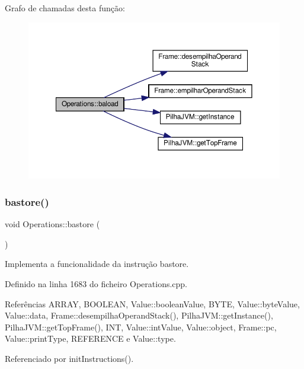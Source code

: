 Grafo de chamadas desta função\+:
\nopagebreak
\begin{figure}[H]
\begin{center}
\leavevmode
\includegraphics[width=350pt]{classOperations_afdf1759637e332569a2b2b17067e05f0_cgraph}
\end{center}
\end{figure}
\mbox{\label{classOperations_a6f0ded6d2fc9921a1418387527bec8f4}} 
\subsubsection{\texorpdfstring{bastore()}{bastore()}}
{\footnotesize\ttfamily void Operations\+::bastore (\begin{DoxyParamCaption}{ }\end{DoxyParamCaption})\hspace{0.3cm}{\ttfamily [private]}}



Implementa a funcionalidade da instrução bastore. 



Definido na linha 1683 do ficheiro Operations.\+cpp.



Referências A\+R\+R\+AY, B\+O\+O\+L\+E\+AN, Value\+::boolean\+Value, B\+Y\+TE, Value\+::byte\+Value, Value\+::data, Frame\+::desempilha\+Operand\+Stack(), Pilha\+J\+V\+M\+::get\+Instance(), Pilha\+J\+V\+M\+::get\+Top\+Frame(), I\+NT, Value\+::int\+Value, Value\+::object, Frame\+::pc, Value\+::print\+Type, R\+E\+F\+E\+R\+E\+N\+CE e Value\+::type.



Referenciado por init\+Instructions().

